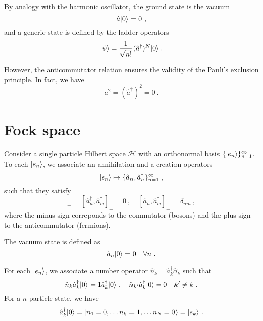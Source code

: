     By analogy with the harmonic oscillator, the ground state is the vacuum 
    \begin{equation*}
        \hat a \vert0\rangle = 0 ~,
    \end{equation*}
    and a generic state is defined by the ladder operators
    \begin{equation*}
        \vert\psi\rangle = \frac{1}{\sqrt{n!}} (\hat a^\dagger)^N \vert0\rangle ~.
    \end{equation*}

    However, the anticommutator relation ensures the validity of the Pauli's exclusion principle. In fact, we have 
    \begin{equation*}
        a^2 = (\hat a^\dagger)^2 = 0 ~.
    \end{equation*}

\section{Fock space}

    Consider a single particle Hilbert space $\mathcal H$ with an orthonormal basis $\{\vert e_n\rangle\}_{n=1}^\infty$. To each $\vert e_n\rangle$, we associate an annihilation and a creation operators 
    \begin{equation*}
        \vert e_n\rangle \mapsto \{\hat a_n, \hat a_n^\dagger \}_{n=1}^\infty ~,
    \end{equation*}
    such that they satisfy 
    \begin{equation*}
        [\hat a_n, \hat a_m]_\pm = [\hat a_n^\dagger, \hat a_m^\dagger]_\pm = 0 ~, \quad [\hat a_n, \hat a_m^\dagger]_\pm = \delta_{nm} ~,
    \end{equation*}
    where the minus sign correponds to the commutator (bosons) and the plus sign to the anticommutator (fermions). 

    The vacuum state is defined as 
    \begin{equation*}
        \hat a_n \vert0\rangle = 0 \quad \forall n~.
    \end{equation*}

    For each $\vert e_n\rangle$, we associate a number operator $\hat n_k = \hat a_k^\dagger \hat a_k$ such that 
    \begin{equation*}
        \hat n_k \hat a_k^\dagger \vert0\rangle = 1 \hat a_k^\dagger \vert0\rangle ~, \quad \hat n_{k'} \hat a_k^\dagger \vert0\rangle = 0 \quad k' \neq k ~.
    \end{equation*}
    For a $n$ particle state, we have 
    \begin{equation*}
        \hat a_k^\dagger \vert0\rangle = \vert n_1=0, \ldots n_k=1, \ldots n_N=0\rangle = \vert e_k\rangle ~.
    \end{equation*}

